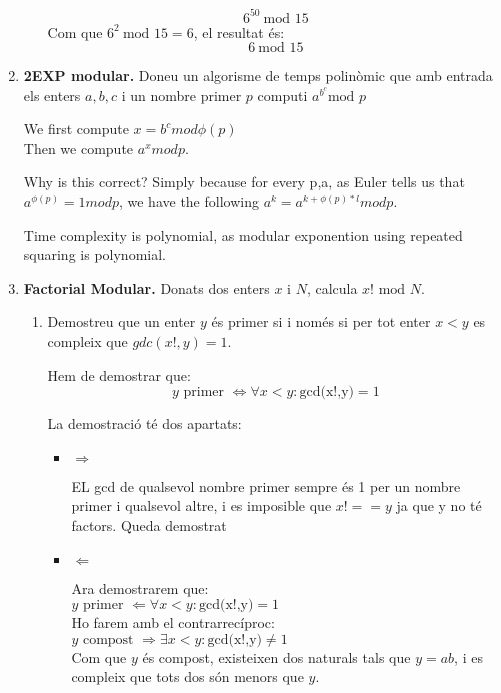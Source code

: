 \documentclass[a4paper,10pt]{article}
\begin{document}
\begin{enumerate}
\begin{enumerate}
    \begin{equation}
  6^{50}\ \textrm{mod } 15
  \end{equation}
Com que $6^2\ \textrm{mod } 15  = 6$, el resultat és:
\begin{equation}
  6\ \textrm{mod } 15
  \end{equation}
 \end{enumerate}
\item \textbf{2EXP modular. }Doneu un algorisme de temps polinòmic que amb entrada els enters $a,b,c$ i un nombre primer $p$ computi $a^{b^c} \textrm{mod } p$

We first compute $x=b^c mod \phi(p)$ \\
Then we compute  $a^x mod p$.

Why is this correct? Simply because for every p,a, as Euler tells us that$a^{\phi(p)}=1 mod p$, we have the following $ a^k = a^{k+\phi(p)*l} mod p $.

Time complexity is polynomial, as modular exponention using repeated squaring is polynomial.

\item \textbf{Factorial Modular. }Donats dos enters $x$ i $N$, calcula $x! \textrm{ mod }N$.

 \begin{enumerate}
  \item Demostreu que un enter $y$ és primer si i només si per tot enter $x < y$ es compleix que $gdc(x!,y) = 1$.
  
  Hem de demostrar que:
  \begin{equation}
   y \textrm{ primer } \Leftrightarrow \forall x < y : \textrm{gcd(x!,y)} = 1
  \end{equation}
  
  La demostració té dos apartats:
  \begin{itemize}
   \item $\Rightarrow$
   
   EL gcd de qualsevol nombre primer sempre és 1 per un nombre primer i qualsevol altre, i es imposible que $x! == y$ ja que y no té factors. Queda demostrat
   
   \item $\Leftarrow$
   
   Ara demostrarem que: \\
   $y \textrm{ primer } \Leftarrow \forall x < y : \textrm{gcd(x!,y)} = 1$ \\
   
   Ho farem amb el contrarrecíproc: \\
   $ y \textrm{ compost } \Rightarrow \exists x < y : \textrm{gcd(x!,y)} \neq 1$ \\
   Com que $y$ és compost, existeixen dos naturals tals que $y = ab$, i es compleix que tots dos són menors que $y$.
   

\end{itemize}
\end{enumerate}
\end{enumerate}
\end{document}

